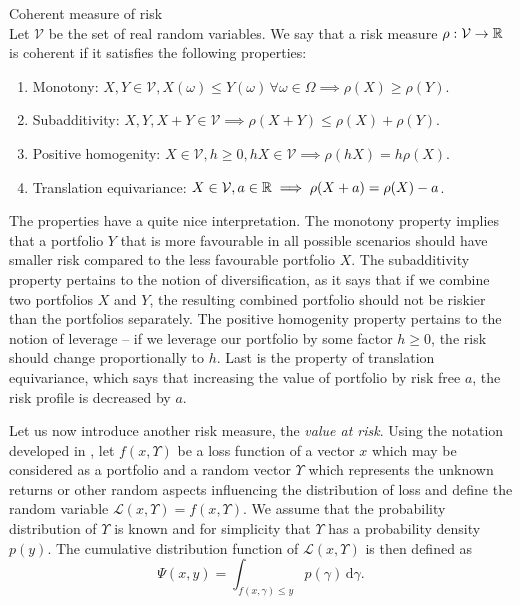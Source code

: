 \begin{defn}{Coherent measure of risk} \\
Let $\mathcal{V}$ be the set of real random variables. We say that a risk measure $\rho: \mathcal{V} \rightarrow \mathbb{R}$ is coherent if it satisfies the following properties:
\begin{enumerate}
	\item Monotony: $X, Y \in \mathcal{V}, X(\omega) \leq Y(\omega) \, \forall \omega \in \Omega \implies \rho(X) \geq \rho(Y)$.
	\item Subadditivity: $X, Y, X+Y \in \mathcal{V} \implies \rho(X+	Y) \leq \rho(X) + \rho(Y)$.
	\item Positive homogenity: $X \in \mathcal{V}, h \geq 0, hX \in \mathcal{V} \implies \rho(hX)=h\rho(X)$.
	\item Translation equivariance: $X \in \mathcal{V}, a \in \mathbb{R} \implies \rho(X+a)=\rho(X)-a$.
\end{enumerate}
\end{defn}
The properties have a quite nice interpretation. The monotony property implies that a portfolio $Y$ that is more favourable in all possible scenarios should have smaller risk compared to the less favourable portfolio $X$. The subadditivity property pertains to the notion of diversification, as it says that if we combine two portfolios $X$ and $Y$, the resulting combined portfolio should not be riskier than the portfolios separately. The positive homogenity property pertains to the notion of leverage -- if we leverage our portfolio by some factor $h\geq0$, the risk should change proportionally to $h$. Last is the property of translation equivariance, which says that increasing the value of portfolio by risk free $a$, the risk profile is decreased by $a$. 

Let us now introduce another risk measure, the \textit{value at risk}.
Using the notation developed in \cite{cornuejols_tutuncu_2006}, let $f(x,\Upsilon)$ be a loss function of a vector $x$ which may be considered as a portfolio and a random vector $\Upsilon$ which represents the unknown returns or other random aspects influencing the distribution of loss and define the random variable $\mathcal{L}(x,\Upsilon)=f(x,\Upsilon)$. We assume that the probability distribution of $\Upsilon$ is known and for simplicity that $\Upsilon$ has a probability density $p(y)$. The cumulative distribution function of $\mathcal{L}(x,\Upsilon)$ is then defined as 
\begin{equation*}
\Psi(x,y)=\int_{f(x,\gamma) \leq y} p(\gamma) \, \mathrm{d}\gamma.
\end{equation*}

